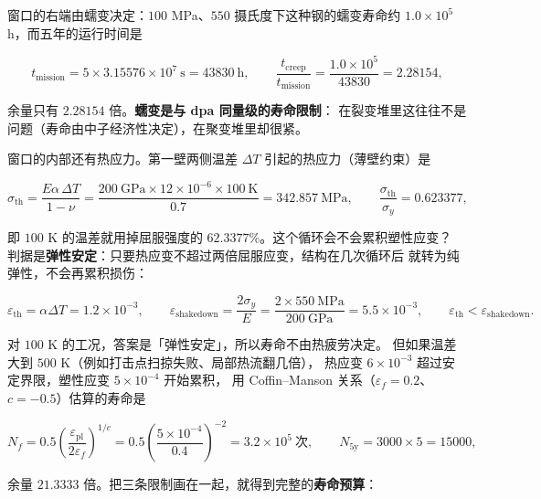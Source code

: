 窗口的右端由蠕变决定：$100$ MPa、$550$ 摄氏度下这种钢的蠕变寿命约
$1.0\times10^{5}$ h，而五年的运行时间是

\begin{equation}
t_\mathrm{mission}=5\times3.15576\times10^{7}\ \mathrm{s}
=43830\ \mathrm{h},
\qquad
\frac{t_\mathrm{creep}}{t_\mathrm{mission}}=\frac{1.0\times10^{5}}{43830}=2.28154,
\label{eq:app-ay-creep}
\end{equation}

余量只有 $2.28154$ 倍。\textbf{蠕变是与 dpa 同量级的寿命限制}：
在裂变堆里这往往不是问题（寿命由中子经济性决定），在聚变堆里却很紧。

窗口的内部还有热应力。第一壁两侧温差 $\Delta T$ 引起的热应力（薄壁约束）是

\begin{equation}
\sigma_\mathrm{th}=\frac{E\alpha\,\Delta T}{1-\nu}
=\frac{200\ \mathrm{GPa}\times12\times10^{-6}\times100\ \mathrm{K}}{0.7}
=342.857\ \mathrm{MPa},
\qquad
\frac{\sigma_\mathrm{th}}{\sigma_y}=0.623377,
\label{eq:app-ay-thermal}
\end{equation}

即 $100$ K 的温差就用掉屈服强度的 $62.3377\%$。这个循环会不会累积塑性应变？
判据是\textbf{弹性安定}：只要热应变不超过两倍屈服应变，结构在几次循环后
就转为纯弹性，不会再累积损伤：

\begin{equation}
\varepsilon_\mathrm{th}=\alpha\Delta T=1.2\times10^{-3},
\qquad
\varepsilon_\mathrm{shakedown}=\frac{2\sigma_y}{E}=\frac{2\times550\ \mathrm{MPa}}{200\ \mathrm{GPa}}
=5.5\times10^{-3},
\qquad
\varepsilon_\mathrm{th}<\varepsilon_\mathrm{shakedown}.
\label{eq:app-ay-shakedown}
\end{equation}

对 $100$ K 的工况，答案是「弹性安定」，所以寿命不由热疲劳决定。
但如果温差大到 $500$ K（例如打击点扫掠失败、局部热流翻几倍），
热应变 $6\times10^{-3}$ 超过安定界限，塑性应变 $5\times10^{-4}$ 开始累积，
用 Coffin--Manson 关系（$\varepsilon_f=0.2$、$c=-0.5$）估算的寿命是

\begin{equation}
N_f=0.5\left(\frac{\varepsilon_\mathrm{pl}}{2\varepsilon_f}\right)^{1/c}
=0.5\left(\frac{5\times10^{-4}}{0.4}\right)^{-2}
=3.2\times10^{5}\ \text{次},
\qquad
N_\mathrm{5y}=3000\times5=15000,
\label{eq:app-ay-cycle}
\end{equation}

余量 $21.3333$ 倍。把三条限制画在一起，就得到完整的\textbf{寿命预算}：

